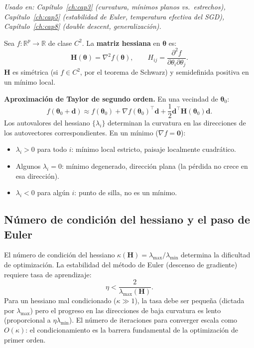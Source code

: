 \textit{Usado en: Capítulo~\ref{ch:cap3} (curvatura, mínimos planos vs.\
estrechos), Capítulo~\ref{ch:cap5} (estabilidad de Euler, temperatura efectiva
del SGD), Capítulo~\ref{ch:cap8} (double descent, generalización).}

\medskip
Sea $f:\mathbb{R}^p\to\mathbb{R}$ de clase $C^2$. La \textbf{matriz hessiana}
en $\bm{\theta}$ es:
\begin{equation}
  \bm{H}(\bm{\theta}) = \nabla^2 f(\bm{\theta}),
  \qquad
  H_{ij} = \frac{\partial^2 f}{\partial\theta_i\partial\theta_j}.
  \label{eq:ap_hessiano}
\end{equation}
$\bm{H}$ es simétrica (si $f\in C^2$, por el teorema de Schwarz) y semidefinida
positiva en un mínimo local.

\medskip\noindent\textbf{Aproximación de Taylor de segundo orden.} En una
vecindad de $\bm{\theta}_0$:
\begin{equation}
  f(\bm{\theta}_0 + \bm{d}) \approx f(\bm{\theta}_0) + \nabla f(\bm{\theta}_0)^\top\bm{d}
  + \frac{1}{2}\bm{d}^\top\bm{H}(\bm{\theta}_0)\bm{d}.
  \label{eq:ap_taylor2}
\end{equation}
Los autovalores del hessiano $\{\lambda_i\}$ determinan la curvatura en las
direcciones de los autovectores correspondientes. En un mínimo ($\nabla f = \bm{0}$):
\begin{itemize}
  \item $\lambda_i > 0$ para todo $i$: mínimo local estricto, paisaje localmente
        cuadrático.
  \item Algunos $\lambda_i = 0$: mínimo degenerado, dirección plana (la pérdida
        no crece en esa dirección).
  \item $\lambda_i < 0$ para algún $i$: punto de silla, no es un mínimo.
\end{itemize}

\subsection{Número de condición del hessiano y el paso de Euler}
\label{subsec:ap_condicion_hessiano}

El número de condición del hessiano $\kappa(\bm{H}) = \lambda_{\max}/\lambda_{\min}$
determina la dificultad de optimización. La estabilidad del método de Euler
(descenso de gradiente) requiere tasa de aprendizaje:
\begin{equation}
  \eta < \frac{2}{\lambda_{\max}(\bm{H})}.
  \label{eq:ap_euler_estabilidad}
\end{equation}
Para un hessiano mal condicionado ($\kappa \gg 1$), la tasa debe ser pequeña
(dictada por $\lambda_{\max}$) pero el progreso en las direcciones de baja
curvatura es lento (proporcional a $\eta\lambda_{\min}$). El número de
iteraciones para converger escala como $O(\kappa)$: el condicionamiento es
la barrera fundamental de la optimización de primer orden.

